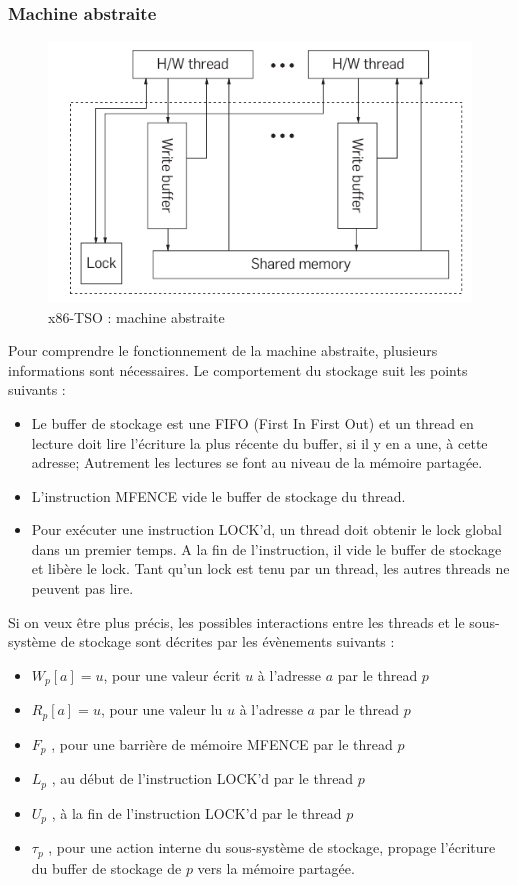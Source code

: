 \documentclass[12pt,a4paper]{article}
\begin{document}
\subsubsection*{Machine abstraite}

\begin{figure}[ht]
	\begin{center}
		\includegraphics[scale=0.8]{mach_abst.png}
		\caption{x86-TSO : machine abstraite}	
	\end{center}
\end{figure}

Pour comprendre le fonctionnement de la machine abstraite, plusieurs informations sont nécessaires. Le comportement du stockage suit les points suivants :
\begin{itemize}
	\item Le buffer de stockage est une FIFO (First In First Out) et un thread en lecture doit lire l'écriture la plus récente du buffer, si il y en a une, à cette adresse; Autrement les lectures se font au niveau de la mémoire partagée.
	\item L'instruction MFENCE vide le buffer de stockage du thread.
	\item Pour exécuter une instruction LOCK'd, un thread doit obtenir le lock global dans un premier temps. A la fin de l'instruction, il vide le buffer de stockage et libère le lock. Tant qu'un lock est tenu par un thread, les autres threads ne peuvent pas lire. 
\end{itemize}
Si on veux être plus précis, les possibles interactions entre les threads et le sous-système de stockage sont décrites par les évènements suivants :

\begin{itemize}
	\item $W_p[a]=u$, pour une valeur écrit $u$ à l'adresse $a$ par le thread $p$	
	\item $R_p[a]=u$, pour une valeur lu $u$ à l'adresse $a$ par le thread $p$
	\item $F_p$ , pour une barrière de mémoire MFENCE par le thread $p$
	\item $L_p$ , au début de l'instruction LOCK'd par le thread $p$
	\item $U_p$ , à la fin de l'instruction LOCK'd par le thread $p$
	\item $\tau_p$ , pour une action interne du sous-système de stockage, propage l'écriture du buffer de stockage de $p$ vers la mémoire partagée.
\end{itemize}
\end{document}
